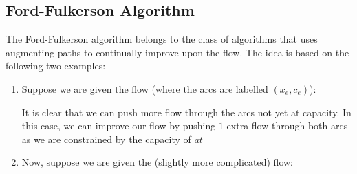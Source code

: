 \subsection{Ford-Fulkerson Algorithm}
The Ford-Fulkerson algorithm belongs to the class of algorithms that uses augmenting paths to continually improve upon the flow.
The idea is based on the following two examples:
\begin{enumerate}
    \item Suppose we are given the flow (where the arcs are labelled $(x_e, c_e)$):

    \begin{minipage}{\textwidth}
        \centering
    \end{minipage}
    
    It is clear that we can push more flow through the arcs not yet at capacity. 
    In this case, we can improve our flow by pushing $1$ extra flow through both arcs as we are constrained by the capacity of $at$

    \item Now, suppose we are given the (slightly more complicated) flow:

    \begin{minipage}{\textwidth}
        \centering
    \end{minipage}


\end{enumerate}
